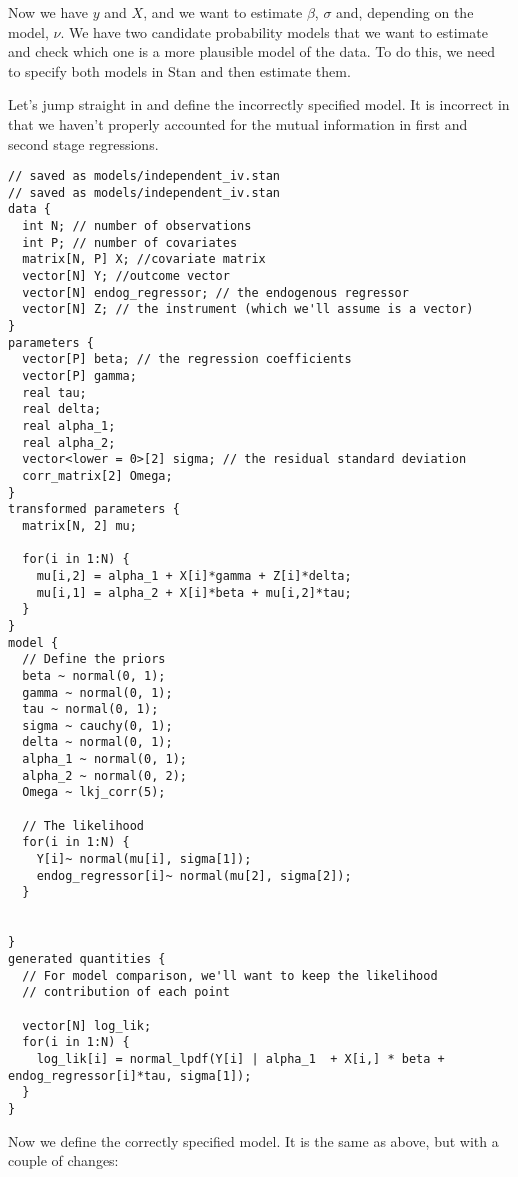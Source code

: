 \documentclass[]{book}
\begin{document}
Now we have \(y\) and \(X\), and we want to estimate \(\beta\),
\(\sigma\) and, depending on the model, \(\nu\). We have two candidate
probability models that we want to estimate and check which one is a
more plausible model of the data. To do this, we need to specify both
models in Stan and then estimate them.

Let's jump straight in and define the incorrectly specified model. It is
incorrect in that we haven't properly accounted for the mutual
information in first and second stage regressions.

\begin{verbatim}
// saved as models/independent_iv.stan
// saved as models/independent_iv.stan
data {
  int N; // number of observations
  int P; // number of covariates
  matrix[N, P] X; //covariate matrix
  vector[N] Y; //outcome vector
  vector[N] endog_regressor; // the endogenous regressor
  vector[N] Z; // the instrument (which we'll assume is a vector)
}
parameters {
  vector[P] beta; // the regression coefficients
  vector[P] gamma;
  real tau;
  real delta;
  real alpha_1;
  real alpha_2;
  vector<lower = 0>[2] sigma; // the residual standard deviation
  corr_matrix[2] Omega;
}
transformed parameters {
  matrix[N, 2] mu;
  
  for(i in 1:N) {
    mu[i,2] = alpha_1 + X[i]*gamma + Z[i]*delta;
    mu[i,1] = alpha_2 + X[i]*beta + mu[i,2]*tau;
  }
}
model {
  // Define the priors
  beta ~ normal(0, 1); 
  gamma ~ normal(0, 1);
  tau ~ normal(0, 1);
  sigma ~ cauchy(0, 1);
  delta ~ normal(0, 1);
  alpha_1 ~ normal(0, 1);
  alpha_2 ~ normal(0, 2);
  Omega ~ lkj_corr(5);
  
  // The likelihood
  for(i in 1:N) {
    Y[i]~ normal(mu[i], sigma[1]);
    endog_regressor[i]~ normal(mu[2], sigma[2]);
  }

  
}
generated quantities {
  // For model comparison, we'll want to keep the likelihood
  // contribution of each point

  vector[N] log_lik;
  for(i in 1:N) {
    log_lik[i] = normal_lpdf(Y[i] | alpha_1  + X[i,] * beta + endog_regressor[i]*tau, sigma[1]);
  }
}
\end{verbatim}

Now we define the correctly specified model. It is the same as above,
but with a couple of changes:
\end{document}

